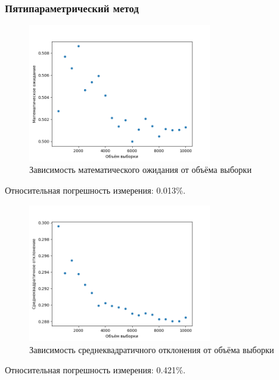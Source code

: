 \documentclass[bachelor, och, labwork]{SCWorks}
\begin{document}
\subsubsection{Пятипараметрический метод}
\begin{figure}[H]
  \centering
  \includegraphics[width=0.7\textwidth]{5p_me.png}
  \caption{Зависимость математического ожидания от объёма выборки}
\end{figure}
Относительная погрешность измерения: 0.013\%.

\begin{figure}[H]
  \centering
  \includegraphics[width=0.7\textwidth]{5p_st.png}
  \caption{Зависимость среднеквадратичного отклонения от объёма выборки}
\end{figure}
Относительная погрешность измерения: 0.421\%.
\end{document}
